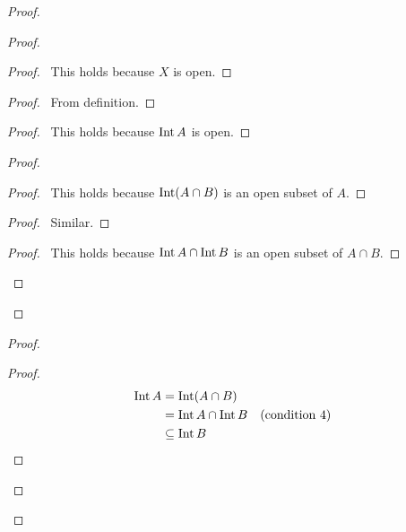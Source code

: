 \begin{proof}
  \pf
  \begin{proof}
    \begin{proof}
      \pf\ This holds because $X$ is open.
    \end{proof}
    \begin{proof}
      \pf\ From definition.
    \end{proof}
    \begin{proof}
      \pf\ This holds because $\operatorname{Int} A$ is open.
    \end{proof}
    \begin{proof}
      \begin{proof}
        \pf\ This holds because $\operatorname{Int} (A \cap B)$ is an open subset of $A$.
      \end{proof}
      \begin{proof}
        \pf\ Similar.
      \end{proof}
      \begin{proof}
        \pf\ This holds because $\operatorname{Int} A \cap \operatorname{Int} B$ is an open subset of $A \cap B$.
      \end{proof}
    \end{proof}
  \end{proof}
  \begin{proof}
    \begin{proof}
      \pf
      \begin{align*}
        \operatorname{Int} A & = \operatorname{Int} (A \cap B) \\
        & = \operatorname{Int} A \cap \operatorname{Int} B & (\text{condition 4}) \\
        & \subseteq \operatorname{Int} B
      \end{align*}
    \end{proof}

\end{proof}
\end{proof}
